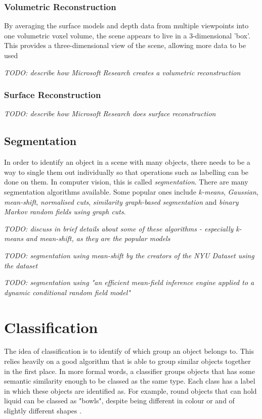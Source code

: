 \documentclass[11pt,openright,a4paper]{report}
\begin{document}
\subsection{Volumetric Reconstruction}
By averaging the surface models and depth data from multiple viewpoints into one volumetric voxel volume, the scene appears to live in a 3-dimensional 'box'. This provides a three-dimensional view of the scene, allowing more data to be used 

\textit{TODO: describe how Microsoft Research \cite{ms-3d-paper} creates a volumetric reconstruction}

\subsection{Surface Reconstruction} 
\textit{TODO: describe how Microsoft Research \cite{ms-surface-paper} does surface reconstruction}

\section{Segmentation}
In order to identify an object in a scene with many objects, there needs to be a way to single them out individually so that operations such as labelling can be done on them. In computer vision, this is called \textit{segmentation}. There are many segmentation algorithms available. Some popular ones include \textit{k-means}, \textit{Gaussian}, \textit{mean-shift}, \textit{normalised cuts}, \textit{similarity graph-based segmentation} and \textit{binary Markov random fields using graph cuts}.

\textit{TODO: discuss in brief details about some of these algorithms - especially k-means and mean-shift, as they are the popular models}

\textit{TODO: segmentation using mean-shift by the creators of the NYU Dataset using the dataset \cite{nyu-dataset}}

\textit{TODO: segmentation using "an efficient mean-field inference engine applied to a dynamic conditional random field model" \cite{semantic-paint}}

\newpage

\chapter{Classification}
The idea of classification is to identify of which group an object belongs to. This relies heavily on a good algorithm that is able to group similar objects together in the first place. In more formal words, a classifier groups objects that has some semantic similarity enough to be classed as the same type. Each class has a label in which these objects are identified as. For example, round objects that can hold liquid can be classed as "bowls", despite being different in colour or and of slightly different shapes \cite{hall-notes}. 
\end{document}
